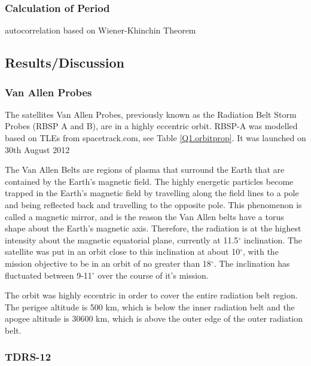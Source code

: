 \documentclass[Space3_Assign1.tex]{subfiles}
\begin{document}
\subsubsection{Calculation of Period}
autocorrelation based on Wiener-Khinchin Theorem


\subsection{Results/Discussion}
\subsubsection{Van Allen Probes}
The satellites Van Allen Probes, previously known as the Radiation Belt Storm Probes (RBSP A and B), are in a highly eccentric orbit. RBSP-A was modelled based on TLEs from spacetrack.com, see Table \ref{Q1.orbitprop}. It was launched on 30th August 2012 

The Van Allen Belts are regions of plasma that surround the Earth that are contained by the Earth's magnetic field. The highly energetic particles become trapped in the Earth's magnetic field by travelling along the field lines to a pole and being reflected back and travelling to the opposite pole. This phenomenon is called a magnetic mirror, and is the reason the Van Allen belts have a torus shape about the Earth's magnetic axis. Therefore, the radiation is at the highest intensity about the magnetic equatorial plane, currently at 11.5$^{\circ}$ inclination. The satellite was put in an orbit close to this inclination at about 10$^{\circ}$, with the mission objective to be in an orbit of no greater than 18$^{\circ}$. The inclination has fluctuated between 9-11$^{\circ}$ over the course of it's mission.

The orbit was highly eccentric in order to cover the entire radiation belt region. The perigee altitude is 500 km, which is below the inner radiation belt and the apogee altitude is 30600 km, which is above the outer edge of the outer radiation belt.

\subsubsection{TDRS-12}
\end{document}
